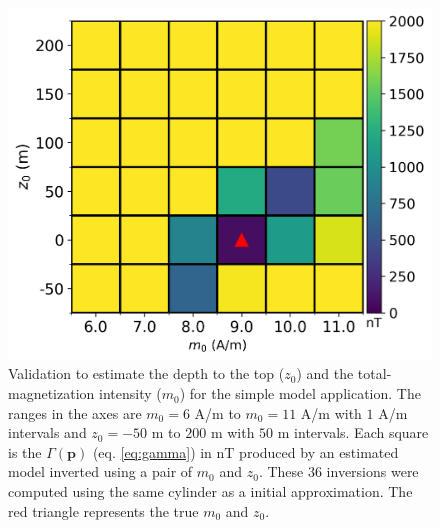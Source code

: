 \begin{figure}
	\centering
	\includegraphics[scale=.75]{figures/simple_gamma.png}
	\caption{Validation to estimate the depth to the top ($ z_0 $) and the total-magnetization intensity ($ m_0 $) for the simple model application. The ranges in the axes are $m_0 = 6$ A/m to $m_0=11$ A/m with $1$ A/m intervals and $z_0=-50$ m to $200$ m with $50$ m intervals. Each square is the $\Gamma (\mathbf{p})$ (eq. \ref{eq:gamma}) in nT produced by an estimated model inverted using a pair of $m_0$ and $z_0$. These 36 inversions were computed using the same cylinder as a initial approximation. The red triangle represents the true $m_0$ and $z_0$.
	}
	\label{fig:simple_map}
\end{figure}

